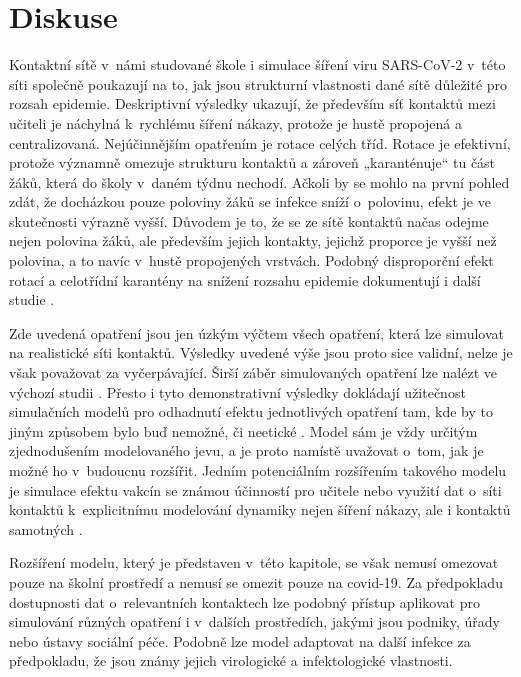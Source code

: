\section*{Diskuse} 
Kontaktní sítě v~námi studované škole i simulace šíření viru SARS-CoV-2 v~této síti společně poukazují na to, jak jsou strukturní vlastnosti dané sítě důležité pro rozsah epidemie. Deskriptivní výsledky ukazují, že především síť kontaktů mezi učiteli je náchylná k~rychlému šíření nákazy, protože je hustě propojená a centralizovaná. Nejúčinnějším opatřením je rotace celých tříd. Rotace je efektivní, protože významně omezuje strukturu kontaktů a zároveň „karanténuje“ tu část žáků, která do školy v~daném týdnu nechodí. Ačkoli by se mohlo na první pohled zdát, že docházkou pouze poloviny žáků se infekce sníží o~polovinu, efekt je ve skutečnosti výrazně vyšší. Důvodem je to, že se ze sítě kontaktů načas odejme nejen polovina žáků, ale především jejich kontakty, jejichž proporce je vyšší než polovina, a to navíc v~hustě propojených vrstvách. Podobný disproporční efekt rotací a celotřídní karantény na snížení rozsahu epidemie dokumentují i další studie \cite{gemmetto2014mitigation, mcgee2021model}. 

Zde uvedená opatření jsou jen úzkým výčtem všech opatření, která lze simulovat na realistické síti kontaktů. Výsledky uvedené výše jsou proto sice validní, nelze je však považovat za vyčerpávající. Širší záběr simulovaných opatření lze nalézt ve výchozí studii \cite{Brom2021.06.28.21259628}. Přesto i tyto demonstrativní výsledky dokládají užitečnost simulačních modelů pro odhadnutí efektu jednotlivých opatření tam, kde by to jiným způsobem bylo buď nemožné, či neetické \cite{squazzoni2020computational}. Model sám je vždy určitým zjednodušením modelovaného jevu, a je proto namístě uvažovat o~tom, jak je možné ho v~budoucnu rozšířit. Jedním potenciálním rozšířením takového modelu je simulace efektu vakcín se známou účinností pro učitele \cite{mcgee2021model} nebo využití dat o~síti kontaktů k~explicitnímu modelování dynamiky nejen šíření nákazy, ale i kontaktů samotných \cite{Rao_etal2021}.

Rozšíření modelu, který je představen v~této kapitole, se však nemusí omezovat pouze na školní prostředí a nemusí se omezit pouze na covid-19. Za předpokladu dostupnosti dat o~relevantních kontaktech lze podobný přístup aplikovat pro simulování různých opatření i v~dalších prostředích, jakými jsou podniky, úřady nebo ústavy sociální péče. Podobně lze model adaptovat na další infekce za předpokladu, že jsou známy jejich virologické a infektologické vlastnosti. 

